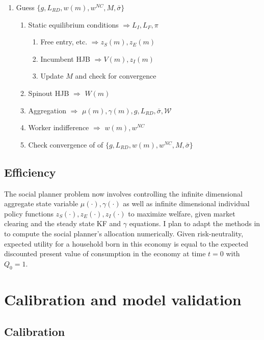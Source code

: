 \documentclass[12pt,english]{article}
\theoremstyle{remark}
\begin{document}
\begin{enumerate}
	\item Guess $\{g, L_{RD}, w(m), w^{NC}, M, \bar{\sigma} \}$
	\begin{enumerate}
		\item Static equilibrium conditions $\Rightarrow L_I,L_F,\pi$
		\begin{enumerate}
			\item Free entry, etc. $\Rightarrow z_S(m), z_E(m)$
			\item Incumbent HJB $\Rightarrow  V(m),z_I(m)$ 
			\item Update $M$ and check for convergence
		\end{enumerate}
		\item Spinout HJB $\Rightarrow$ $W(m)$
		\item Aggregation $\Rightarrow$ $\mu(m),\gamma(m),g,L_{RD},\bar{\sigma},\mathcal{W}$
		\item Worker indifference $\Rightarrow$ $w(m),w^{NC}$
		\item Check convergence of of $\{g, L_{RD}, w(m), w^{NC}, M, \bar{\sigma} \}$
	\end{enumerate}
\end{enumerate}


\subsection{Efficiency}

The social planner problem now involves controlling the infinite dimensional aggregate state variable $\mu(\cdot), \gamma(\cdot)$ as well as infinite dimensional individual policy functions $z_S(\cdot),z_E(\cdot),z_I(\cdot)$ to maximize welfare, given market clearing and the steady state KF and $\gamma$ equations. I plan to adapt the methods in \cite{nuno_social_2018} to compute the social planner's allocation numerically. Given risk-neutrality, expected utility for a household born in this economy is equal to the expected discounted present value of consumption in the economy at time $t = 0$ with $Q_0 = 1$. 

\section{Calibration and model validation}

\subsection{Calibration}
\end{document}
